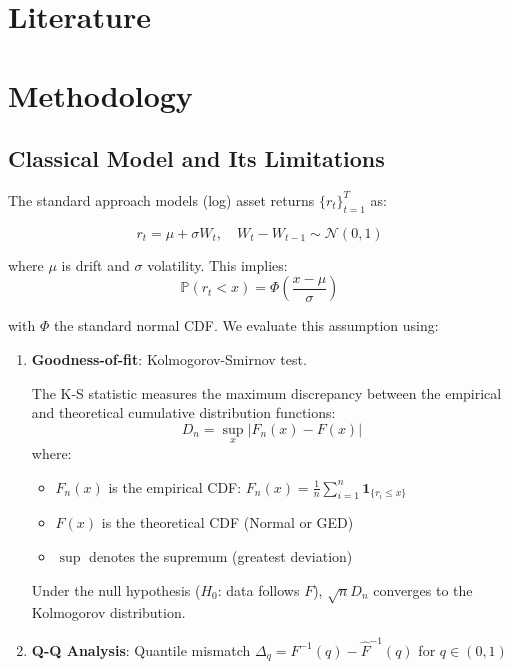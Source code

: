 \documentclass[12pt]{article}
\begin{document}
\section{Literature}
\label{sec:literature}

\section{Methodology}
\label{sec:methodology}

\subsection{Classical Model and Its Limitations}
The standard approach models (log) asset returns $\{r_t\}_{t=1}^T$ as:

\begin{equation}
    r_t = \mu + \sigma W_t, \quad W_t - W_{t-1} \sim \mathcal{N}(0,1)
\end{equation}

where $\mu$ is drift and $\sigma$ volatility. This implies:
\begin{equation}
    \mathbb{P}(r_t < x) = \Phi\left(\frac{x-\mu}{\sigma}\right)
\end{equation}

with $\Phi$ the standard normal CDF. We evaluate this assumption using:

\begin{enumerate}
    \item \textbf{Goodness-of-fit}: Kolmogorov-Smirnov test.

    The K-S statistic measures the maximum discrepancy between the empirical and theoretical cumulative distribution functions:
    \begin{equation}
    D_n = \sup_{x} \left| F_n(x) - F(x) \right|
    \end{equation}
    where:
    \begin{itemize}
        \item $F_n(x)$ is the empirical CDF: $F_n(x) = \frac{1}{n} \sum_{i=1}^n \mathbf{1}_{\{r_i \leq x\}}$
        \item $F(x)$ is the theoretical CDF (Normal or GED)
        \item $\sup$ denotes the supremum (greatest deviation)
    \end{itemize}
    Under the null hypothesis ($H_0$: data follows $F$), $\sqrt{n}D_n$ converges to the Kolmogorov distribution.

    \item \textbf{Q-Q Analysis}: Quantile mismatch $\Delta_q = F^{-1}(q) - \hat{F}^{-1}(q)$ for $q \in (0,1)$
\end{enumerate}
\end{document}
